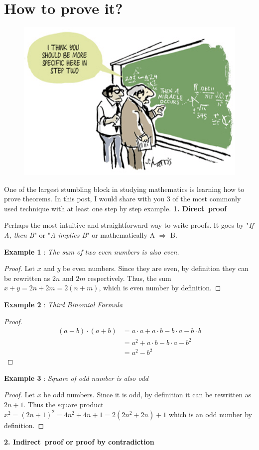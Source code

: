 \chapter{How to prove it?}
\begin{figure}[htp]
	\centering
	\includegraphics[width=\linewidth]{Assets/0_W-tEtGVYH9eM9HNx}
	\caption{}
	\label{fig:specific}
\end{figure}

One of the largest stumbling block in studying mathematics is learning how to prove theorems. In this post, I would share with you 3 of the most commonly used technique with at least one step by step example.
\newpage
\noindent \textbf{1. Direct proof}

\noindent Perhaps the most intuitive and straightforward way to write proofs. It goes by "\textit{If A, then B}" or  "\textit{A implies B}" or mathematically A $\Rightarrow$ B.

\noindent\textbf{Example 1} : \textit{The sum of two even numbers is also even.}
\begin{proof}
	Let $x$ and $y$ be even numbers. Since they are even, by definition they can be rewritten as $2n$ and $2m$ respectively. Thus, the sum $x+y = 2n+2m = 2(n+m)$, which is even number by definition.
\end{proof}
\noindent\textbf{Example 2} : \textit{Third Binomial Formula}
\begin{proof}
\begin{align}
(a-b)\cdot (a+b)&= a\cdot a+a\cdot b-b \cdot a-b \cdot b\\ 
			&= a^2+a \cdot b-b \cdot a-b^2\\ 
			&= a^2-b^2 
\end{align}
\end{proof}
\noindent\textbf{Example 3} : \textit{Square of odd number is also odd}
\begin{proof}
Let $x$ be odd numbers. Since it is odd, by definition it can be rewritten as $2n+1$. Thus the square product $x^2 = (2n+1)^2 = 4n^2+4n+1 = 2(2n^2+2n)+1$ which is an odd number by definition.
\end{proof}
\noindent \textbf{2. Indirect proof or proof by contradiction}

